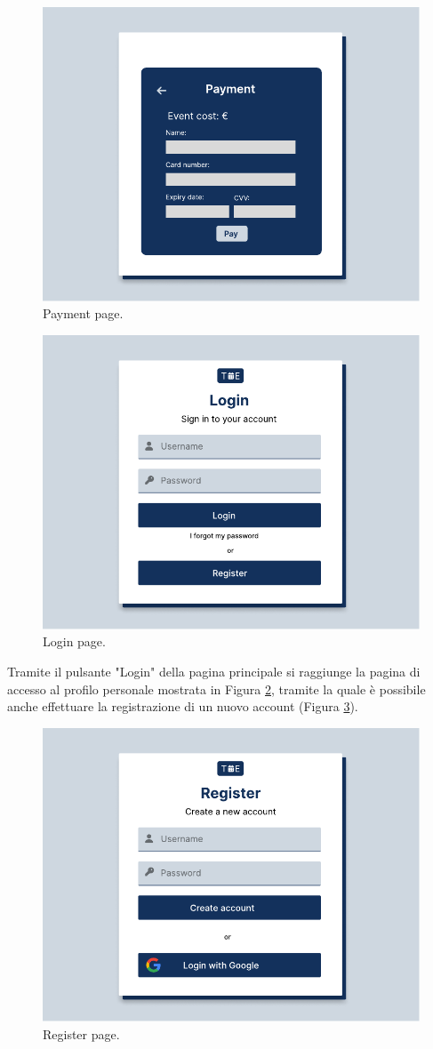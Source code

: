 \documentclass[9pt]{extarticle}
\begin{document}
\begin{figure}[!htb]
	\centering
	\includegraphics[width=.7\linewidth]{./images/PaymentPage.pdf}
	\caption{Payment page.}
	\label{fig:paymentPage}
\end{figure}


\begin{figure}[!htb]
	\centering
	\includegraphics[width=.7\linewidth]{./images/Login.pdf}
	\caption{Login page.}
	\label{fig:login}
\end{figure}

Tramite il pulsante "Login" della pagina principale si raggiunge la pagina di accesso al profilo personale mostrata in Figura \ref{fig:login}, tramite la quale è possibile anche effettuare la registrazione di un nuovo account (Figura \ref{fig:register}).
\newpage

\begin{figure}[!htb]
	\centering
	\includegraphics[width=.7\linewidth]{./images/Register.pdf}
	\caption{Register page.}
	\label{fig:register}
\end{figure}
\end{document}
